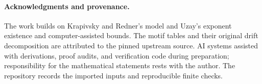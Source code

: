 \paragraph{Acknowledgments and provenance.}
The work builds on Krapivsky and Redner's model and Uzay's exponent
existence and computer-assisted bounds. The motif tables and their
original drift decomposition are attributed to the pinned upstream
source. AI systems assisted with derivations, proof audits, and
verification code during preparation; responsibility for the
mathematical statements rests with the author. The repository records
the imported inputs and reproducible finite checks.
